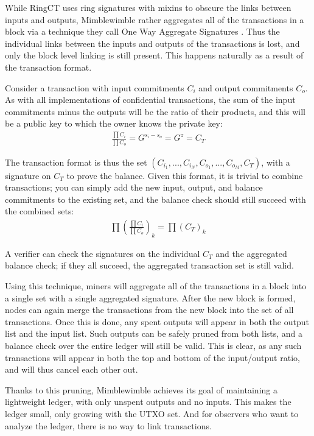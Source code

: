 \documentclass{article}
\begin{document}
While RingCT uses ring signatures with mixins to obscure the links between inputs and outputs, Mimblewimble rather aggregates all of the transactions in a block via a technique they call One Way Aggregate Signatures \cite{increasingBitcoinAnonymity}.  Thus the individual links between the inputs and outputs of the transactions is lost, and only the block level linking is still present.  This happens naturally as a result of the transaction format.

Consider a transaction with input commitments $C_i$ and output commitments $C_o$.  As with all implementations of confidential transactions, the sum of the input commitments minus the outputs will be the ratio of their products, and this will be a public key to which the owner knows the private key:
\begin{align}
  \frac{\prod C_i}{\prod C_o} = G^{s_i - s_o} = G^z = C_T
\end{align}

The transaction format is thus the set $(C_{i_1}, ..., C_{i_N}, C_{o_1}, ..., C_{o_M}, C_T)$, with a signature on $C_T$ to prove the balance.  Given this format, it is trivial to combine transactions; you can simply add the new input, output, and balance commitments to the existing set, and the balance check should still succeed with the combined sets:
\begin{align}
  \prod (\frac{\prod C_i}{\prod C_o})_k= \prod (C_T)_k
\end{align}

A verifier can check the signatures on the individual $C_T$ and the aggregated balance check; if they all succeed, the aggregated transaction set is still valid.

Using this technique, miners will aggregate all of the transactions in a block into a single set with a single aggregated signature.  After the new block is formed, nodes can again merge the transactions from the new block into the set of all transactions.  Once this is done, any spent outputs will appear in both the output list and the input list.  Such outputs can be safely pruned from both lists, and a balance check over the entire ledger will still be valid.  This is clear, as any such transactions will appear in both the top and bottom of the input/output ratio, and will thus cancel each other out.  

Thanks to this pruning, Mimblewimble achieves its goal of maintaining a lightweight ledger, with only unspent outputs and no inputs.  This makes the ledger small, only growing with the UTXO set.  And for observers who want to analyze the ledger, there is no way to link transactions.
\end{document}
